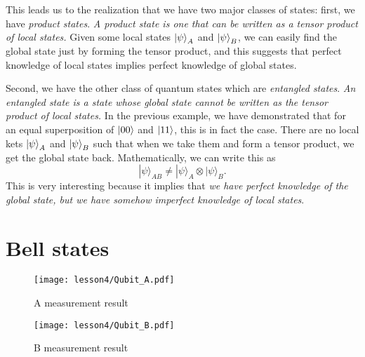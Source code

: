 This leads us to the realization that we have two major classes of states: first, we have \emph{product states}. %
\emph{A product state is one that can be written as a tensor product of local states.} Given some local states $\left| \psi \right\rangle_A$ and $\left| \psi \right\rangle_B$, we can easily find the global state just by forming the tensor product, and this suggests that perfect knowledge of local states implies perfect knowledge of global states.

Second, we have the other class of quantum states which are \emph{entangled states}. \emph{An entangled state is a state whose global state cannot be written as the tensor product of local states.} In the previous example, we have demonstrated that for an equal superposition of $\left| 00 \right\rangle$ and $\left| 11 \right\rangle$, this is in fact the case. There are no local kets $\left| \psi \right\rangle_A$ and $\left| \psi \right\rangle_B$ such that when we take them and form a tensor product, we get the global state back. Mathematically, we can write this as
\begin{equation}
|\psi\rangle_{A B} \neq|\psi\rangle_{A} \otimes|\psi\rangle_{B}.
\end{equation}
This is very interesting because it implies that \emph{we have perfect knowledge of the global state, but we have somehow imperfect knowledge of local states}.

\section{Bell states}

\begin{figure}[H]
    \centering
    \texttt{[image: lesson4/Qubit\_A.pdf]}
    \label{fig: 1}
    
        \caption{A measurement result}
    
\end{figure}

\begin{figure}[H]
    \centering
    \texttt{[image: lesson4/Qubit\_B.pdf]}
    \label{fig: 1}
    
        \caption{B measurement result}
    
\end{figure}
\fi

